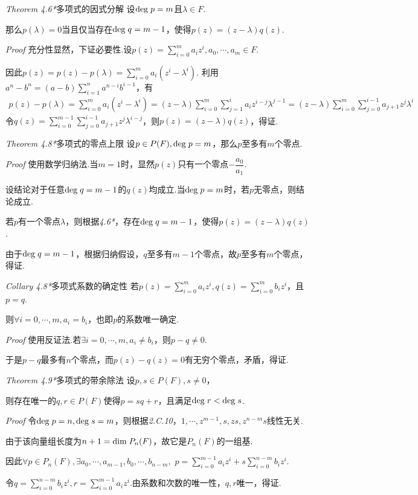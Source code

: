 \textit{Theorem 4.6*}{\kaishu 多项式的因式分解}
设\(\mathrm{deg \;} p=m\)且\(\lambda \in F\).

那么\(p(\lambda)=0\)当且仅当存在\(\mathrm{deg \;} q=m-1\)，使得\(p(z)=(z-\lambda)q(z)\).

\textit{Proof}
充分性显然，下证必要性.设\(p(z)=\sum_{i=0}^m a_iz^i,a_0,\cdots,a_m \in F\).

因此\(p(z)=p(z)-p(\lambda)=\sum_{i=0}^m a_i(z^i-\lambda^i)\).
利用\(a^n-b^n=(a-b)\sum_{i=1}^n a^{n-i}b^{i-1}\)，有
    \begin{align*}
        p(z)-p(\lambda)=\sum_{i=0}^m a_i(z^i-\lambda^i)
                       =(z-\lambda)\sum_{i=0}^m \sum_{j=1}^i a_iz^{i-j}\lambda^{j-1}
                       =(z-\lambda)\sum_{i=0}^m \sum_{j=0}^{i-1} a_{j+1}z^j\lambda^i
    \end{align*}
令\(q(z)=\sum_{i=0}^{m-1} \sum_{j=0}^{i-1} a_{j+1}z^j\lambda^{i-j}\)，则\(p(z)=(z-\lambda)q(z)\)，得证.

\hspace*{\fill}

\textit{Theorem 4.8*}{\kaishu 多项式的零点上限}
设\(p \in P(F),\mathrm{deg \;} p=m\)，那么\(p\)至多有\(m\)个零点.

\textit{Proof}
使用数学归纳法.当\(m=1\)时，显然\(p(z)\)只有一个零点\(-\dfrac{a_0}{a_1}\).

设结论对于任意\(\mathrm{deg \;} q=m-1\)的\(q(z)\)均成立.当\(\mathrm{deg \;} p=m\)时，若\(p\)无零点，则结论成立.

若\(p\)有一个零点\(\lambda\)，则根据\textit{4.6*}，存在\(\mathrm{deg \;} q=m-1\)，使得\(p(z)=(z-\lambda)q(z)\).

由于\(\mathrm{deg \;} q=m-1\)，根据归纳假设，\(q\)至多有\(m-1\)个零点，故\(p\)至多有\(m\)个零点，得证.

\hspace*{\fill}

\textit{Collary 4.8*}{\kaishu 多项式系数的确定性}
若\(p(z)=\sum_{i=0}^m a_iz^i,q(z)=\sum_{i=0}^m b_iz^i\)，且\(p=q\).

则\(\forall i=0,\cdots,m,a_i=b_i\)，也即\(p\)的系数唯一确定.

\textit{Proof}
使用反证法.若\(\exists i=0,\cdots,m,a_i \ne b_i\)，则\(p-q \ne 0\).

于是\(p-q\)最多有\(n\)个零点，而\(p(z)-q(z)=0\)有无穷个零点，矛盾，得证.

\hspace*{\fill}

\textit{Theorem 4.9*}{\kaishu 多项式的带余除法}
设\(p,s \in P(F),s \ne 0\)，

则存在唯一的\(q,r \in P(F)\)使得\(p=sq+r\)，且满足\(\mathrm{deg \;} r<\mathrm{deg \;} s\).

\textit{Proof}
令\(\mathrm{deg \;} p=n,\mathrm{deg \;} s=m\)，则根据\textit{2.C.10}，\(1,\cdots,z^{m-1},s,zs,z^{n-m}s\)线性无关.

由于该向量组长度为\(n+1=\mathrm{dim \;} P_n(F)\)，故它是\(P_n(F)\)的一组基.

因此\(\forall p \in P_n(F),\exists a_0,\cdots,a_{m-1},b_0,\cdots,b_{n-m},\)
\(p=\sum_{i=0}^{m-1}a_iz^i+s\sum_{i=0}^{n-m}b_iz^i\).

令\(q=\sum_{i=0}^{n-m}b_iz^i,r=\sum_{i=0}^{m-1}a_iz^i\).由系数和次数的唯一性，\(q,r\)唯一，得证.

